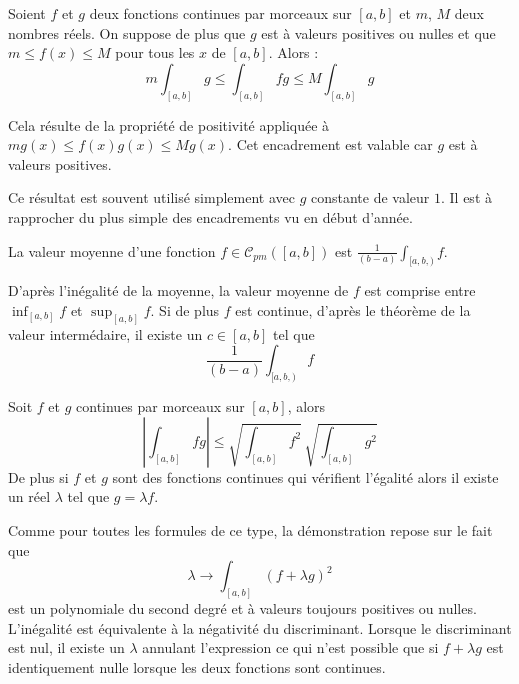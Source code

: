 \begin{propn}
 Soient $f$ et $g$ deux fonctions continues par morceaux sur $[a,b]$ et $m$, $M$ deux nombres réels. On suppose de plus que $g$ est à valeurs positives ou nulles et que $m\leq f(x)\leq M$ pour tous les $x$ de $[a,b]$. Alors :
\begin{displaymath}
 m\int_{[a,b]}g \leq \int_{[a,b]}fg \leq M\int_{[a,b]}g
\end{displaymath}
\end{propn}
\begin{demo}
 Cela résulte de la propriété de positivité appliquée à $mg(x)\leq f(x)g(x) \leq Mg(x)$. Cet encadrement est valable car $g$ est à valeurs positives.
\end{demo}
\begin{rem}
 Ce résultat est souvent utilisé simplement avec $g$ constante de valeur $1$. Il est à rapprocher du plus simple des encadrements vu en début d'année.
\end{rem}
\begin{defi}
 La valeur moyenne d'une fonction $f\in \mathcal{C}_{pm}([a,b])$ est $\frac{1}{(b-a)}\int_{[a,b,)}f$.
\end{defi}
\begin{rem}
 D'après l'inégalité de la moyenne, la valeur moyenne de $f$ est comprise entre $\inf_{[a,b]}f$ et $\sup_{[a,b]}f$. Si de plus $f$ est continue, d'après le théorème de la valeur intermédaire, il existe un $c\in[a,b]$ tel que
\begin{displaymath}
 \frac{1}{(b-a)}\int_{[a,b,)}f
\end{displaymath}
\end{rem}
\begin{propn}
 Soit $f$ et $g$ continues par morceaux sur $[a,b]$, alors
\begin{displaymath}
 \left\vert \int_{[a,b]}fg \right\vert \leq
\sqrt{\int_{[a,b]}f^2}\,\sqrt{\int_{[a,b]}g^2}
\end{displaymath}
De plus si $f$ et $g$ sont des fonctions continues qui vérifient l'égalité alors il existe un réel $\lambda$ tel que $g=\lambda f$.
\end{propn}
\begin{demo}
 Comme pour toutes les formules de ce type, la démonstration repose sur le fait que
\begin{displaymath}
 \lambda \rightarrow \int_{[a,b]}(f+\lambda g)^2 
\end{displaymath}
est un polynomiale du second degré et à valeurs toujours positives ou nulles. L'inégalité est équivalente à la négativité du discriminant. Lorsque le discriminant est nul, il existe un $\lambda$ annulant l'expression ce qui n'est possible que si $f+\lambda g$ est identiquement nulle lorsque les deux fonctions sont continues.
\end{demo}

